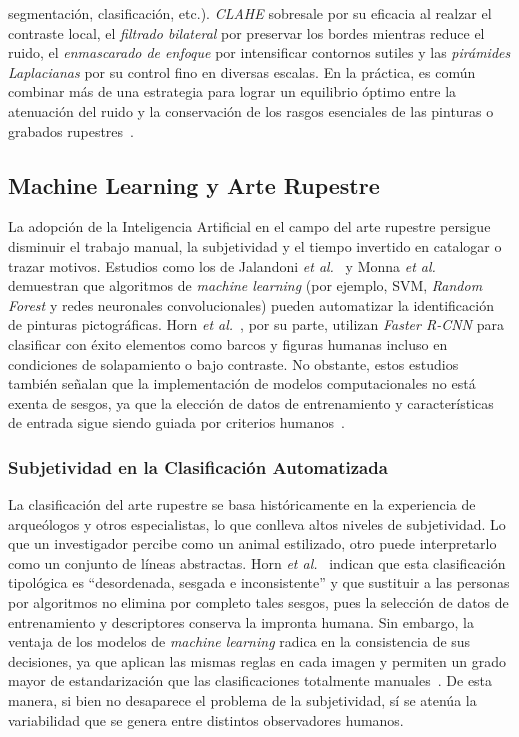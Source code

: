 segmentación, clasificación, etc.). \textit{CLAHE} sobresale por su eficacia al realzar el contraste local, el \textit{filtrado bilateral} por preservar los bordes mientras reduce el ruido, el \textit{enmascarado de enfoque} por intensificar contornos sutiles y las \textit{pirámides Laplacianas} por su control fino en diversas escalas. En la práctica, es común combinar más de una estrategia para lograr un equilibrio óptimo entre la atenuación del ruido y la conservación de los rasgos esenciales de las pinturas o grabados rupestres~\cite{xiao2020,li2022}.

\subsection{Machine Learning y Arte Rupestre}

La adopción de la Inteligencia Artificial en el campo del arte rupestre persigue disminuir el trabajo manual, la subjetividad y el tiempo invertido en catalogar o trazar motivos. Estudios como los de Jalandoni \textit{et al.}~\cite{jalandoni2022} y Monna \textit{et al.}~\cite{monna2022} demuestran que algoritmos de \textit{machine learning} (por ejemplo, SVM, \textit{Random Forest} y redes neuronales convolucionales) pueden automatizar la identificación de pinturas pictográficas. Horn \textit{et al.}~\cite{horn2022}, por su parte, utilizan \textit{Faster R-CNN} para clasificar con éxito elementos como barcos y figuras humanas incluso en condiciones de solapamiento o bajo contraste. No obstante, estos estudios también señalan que la implementación de modelos computacionales no está exenta de sesgos, ya que la elección de datos de entrenamiento y características de entrada sigue siendo guiada por criterios humanos~\cite{horn2022}.

\subsubsection*{Subjetividad en la Clasificación Automatizada}

La clasificación del arte rupestre se basa históricamente en la experiencia de arqueólogos y otros especialistas, lo que conlleva altos niveles de subjetividad. Lo que un investigador percibe como un animal estilizado, otro puede interpretarlo como un conjunto de líneas abstractas. Horn \textit{et al.}~\cite{horn2022} indican que esta clasificación tipológica es “desordenada, sesgada e inconsistente” y que sustituir a las personas por algoritmos no elimina por completo tales sesgos, pues la selección de datos de entrenamiento y descriptores conserva la impronta humana. Sin embargo, la ventaja de los modelos de \textit{machine learning} radica en la consistencia de sus decisiones, ya que aplican las mismas reglas en cada imagen y permiten un grado mayor de estandarización que las clasificaciones totalmente manuales~\cite{jalandoni2022}. De esta manera, si bien no desaparece el problema de la subjetividad, sí se atenúa la variabilidad que se genera entre distintos observadores humanos.

